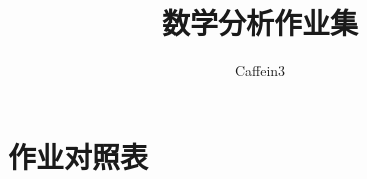 \documentclass[b5paper]{memoir}
\begin{document}
\frontmatter
\title{数学分析作业集}
\author{Caffein3}
\date{}
\maketitle
\tableofcontents
\mainmatter
\setcounter{chapter}{12}







\backmatter
\chapter{作业对照表}
\end{document}
